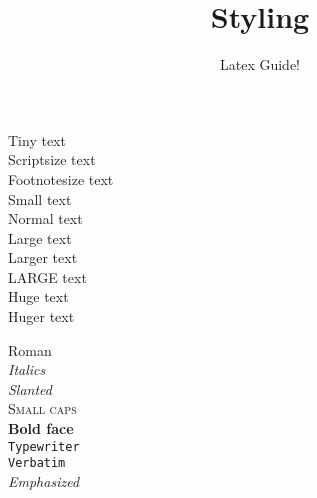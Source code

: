 \documentclass{article}
\author{Latex Guide!}
\title{Styling}
\date{}
\begin{document}
	
	\maketitle
	
	\noindent\tiny{Tiny text}\\
	\scriptsize{Scriptsize text}\\
	\footnotesize{Footnotesize text}\\
	\small{Small text}\\
	\normalsize{Normal text}\\
	\large{Large text}\\
	\Large{Larger text}\\
	\LARGE{LARGE text}\\
	\huge{Huge text}\\
	\Huge{Huger text}\\
	
	\normalsize
	
	\noindent\textrm{Roman}\\
	\textit{Italics}\\
	\textsl{Slanted}\\
	\textsc{Small caps}\\
	\textbf{Bold face}\\
	\texttt{Typewriter}\\
	\verb|Verbatim| \\
	\emph{Emphasized}
	
\end{document}
